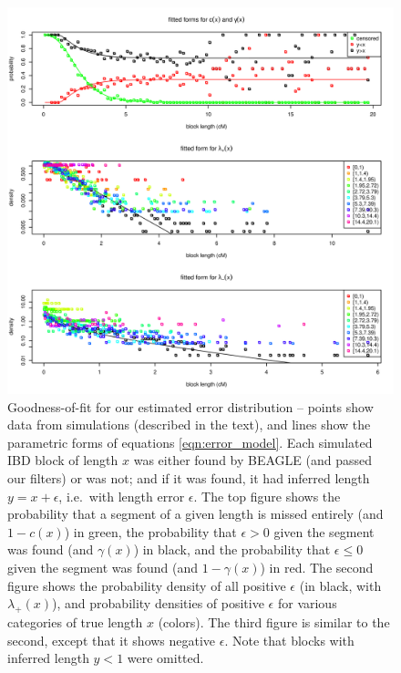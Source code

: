 \documentclass{article}
\begin{document}
\begin{figure}[!htp]
  \begin{center}
    \includegraphics[width=\textwidth]{error-fit-plots}
    \caption{
    Goodness-of-fit for our estimated error distribution --
    points show data from simulations (described in the text),
    and lines show the parametric forms of equations \eqref{eqn:error_model}.
    Each simulated IBD block of length $x$ was either found by BEAGLE (and passed our filters) or was not;
    and if it was found, it had inferred length $y = x+\epsilon$, i.e.\ with length error $\epsilon$.
    The top figure shows the probability that a segment of a given length is missed entirely (and $1-c(x)$) in green,
    the probability that $\epsilon >0$ given the segment was found (and $\gamma(x)$) in black, 
    and the probability that $\epsilon \le 0$ given the segment was found (and $1-\gamma(x)$) in red.
    The second figure shows the probability density of all positive $\epsilon$ (in black, with $\lambda_+(x)$),
    and probability densities of positive $\epsilon$ for various categories of true length $x$ (colors).
    The third figure is similar to the second, except that it shows negative $\epsilon$.
    Note that blocks with inferred length $y<1$ were omitted.
    \label{sfig:fit_error_model}
    }
  \end{center}
\end{figure}
\end{document}
